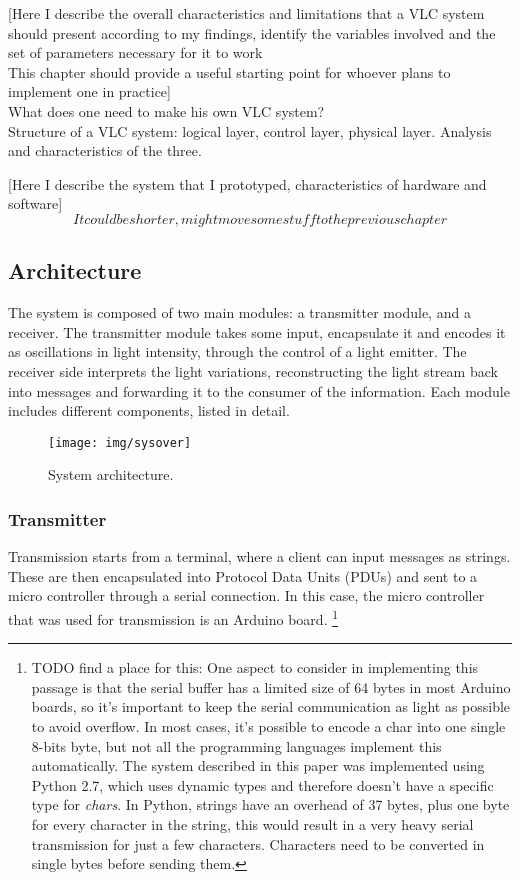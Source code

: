[Here I describe the overall characteristics and limitations that a VLC system should present according to my findings, identify the variables involved and the set of parameters necessary for it to work\\
This chapter should provide a useful starting point for whoever plans to implement one in practice]\\
What does one need to make his own VLC system?\\

Structure of a VLC system: logical layer, control layer, physical layer. Analysis and characteristics of the three.

[Here I describe the system that I prototyped, characteristics of hardware and software]\\
\[It could be shorter, might move some stuff to the previous chapter\]

\subsection{Architecture}

The system is composed of two main modules: a transmitter module, and a receiver.
The transmitter module takes some input, encapsulate it and encodes it as oscillations in light intensity, through the control of a light emitter.
The receiver side interprets the light variations, reconstructing the light stream back into messages and forwarding it to the consumer of the information. 
Each module includes different components, listed in detail.

\begin{figure}
\centering
\texttt{[image: img/sysover]}
\label{fig:sys over}
\caption{System architecture.}
\end{figure}

\subsubsection{Transmitter}
Transmission starts from a terminal, where a client can input messages as strings. These are then encapsulated into Protocol Data Units (PDUs) and sent to a micro controller through a serial connection.
In this case, the micro controller that was used for transmission is an Arduino board.
\footnote{TODO find a place for this: One aspect to consider in implementing this passage is that the serial buffer has a limited size of 64 bytes in most Arduino boards, so it's important to keep the serial communication as light as possible to avoid overflow. In most cases, it's possible to encode a char into one single 8-bits byte, but not all the programming languages implement this automatically.
The system described in this paper was implemented using Python 2.7, which uses dynamic types and therefore doesn't have a specific type for \textit{chars}. In Python, strings have an overhead of 37 bytes, plus one byte for every character in the string, this would result in a very heavy serial transmission for just a few characters. Characters need to be converted in single bytes before sending them. }

